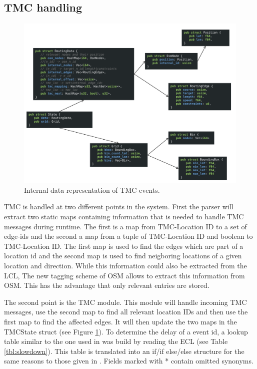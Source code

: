 \documentclass[a4paper]{scrartcl}
\begin{document}
\subsection{TMC handling}
\label{sec:tmc_handling}
\begin{figure}[t]
\centering
\includegraphics[width=1.0\textwidth,page=2]{img/data_structures.pdf}
\caption{Internal data representation of TMC events.}
\label{data_tmc}
\end{figure}

TMC is handled at two different points in the system. First the parser will extract two static maps containing information that is needed to handle TMC messages during runtime.
The first is a map from TMC-Location ID to a set of edge-ids and the second a map from a tuple of TMC-Location ID and boolean to TMC-Location ID. The first map is used to find the edges which are part of a location id and the second map is used to find neigboring locations of a given location and direction. While this information could also be extracted from the LCL, The new tagging scheme of OSM allows to extract this information from OSM. This has the advantage that only relevant entries are stored. 

The second point is the TMC module. This module will handle incoming TMC messages, use the second map to find all relevant location IDs and then use the first map to find the affected edges. It will then update the two maps in the TMCState struct (see Figure \ref{data_tmc}). To determine the delay of a event id, a lookup table similar to the one used in \cite{sanwald2013} was build by reading the ECL (see Table \ref{tbl:slowdown}). 
This table is translated into an if/if else/else structure for the same reasons to those given in \cite{sanwald2013}. Fields marked with * contain omitted synonyms.
\end{document}
